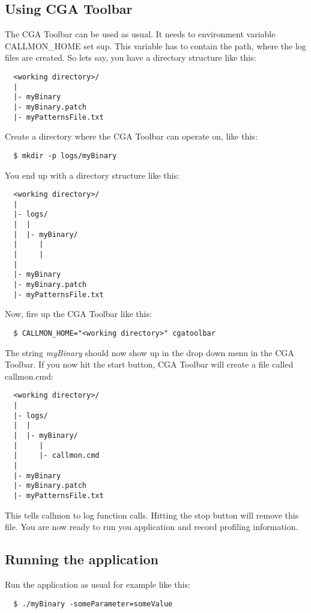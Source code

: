 \subsection{Using CGA Toolbar} The CGA Toolbar can be used as usual. It needs to environment variable CALLMON\_HOME set sup. This variable has to contain the path, where the log files are created. So lets say, you have a directory structure like this:

\begin{verbatim}
  <working directory>/
  |
  |- myBinary
  |- myBinary.patch
  |- myPatternsFile.txt
\end{verbatim}

Create a directory where the CGA Toolbar can operate on, like this:
\begin{verbatim}
  $ mkdir -p logs/myBinary
\end{verbatim}

You end up with a directory structure like this:
\begin{verbatim}
  <working directory>/
  |
  |- logs/
  |  |
  |  |- myBinary/
  |     |
  |     |
  |
  |- myBinary
  |- myBinary.patch
  |- myPatternsFile.txt
\end{verbatim}

Now, fire up the CGA Toolbar like this:
\begin{verbatim}
  $ CALLMON_HOME="<working directory>" cgatoolbar
\end{verbatim}

The string \emph{myBinary} should now show up in the drop down menu in the CGA Toolbar. If you now hit the start button, CGA Toolbar will create a file called callmon.cmd:
\begin{verbatim}
  <working directory>/
  |
  |- logs/
  |  |
  |  |- myBinary/
  |     |
  |     |- callmon.cmd
  |
  |- myBinary
  |- myBinary.patch
  |- myPatternsFile.txt
\end{verbatim}

This tells callmon to log function calls. Hitting the stop button will remove this file. You are now ready to run you application and record profiling information.

\subsection{Running the application} Run the application as usual for example like this:
\begin{verbatim}
  $ ./myBinary -someParameter=someValue
\end{verbatim}

